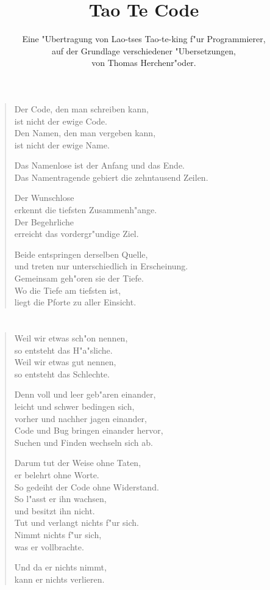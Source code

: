 \documentclass[a4paper,10pt,openany]{book}
\title{Tao Te Code}
\author{Eine "Ubertragung von Lao-tses Tao-te-king f"ur Programmierer,\\
auf der Grundlage verschiedener "Ubersetzungen,\\
von Thomas Herchenr"oder.}
\begin{document}
\maketitle


\chapter{}
\begin{verse}
Der Code, den man schreiben kann,\\
ist nicht der ewige Code.\\
Den Namen, den man vergeben kann,\\
ist nicht der ewige Name.

Das Namenlose ist der Anfang und das Ende.\\
Das Namentragende gebiert die zehntausend Zeilen.

Der Wunschlose\\
erkennt die tiefsten Zusammenh"ange.\\
Der Begehrliche\\
erreicht das vordergr"undige Ziel.

Beide entspringen derselben Quelle,\\
und treten nur unterschiedlich in Erscheinung.\\
Gemeinsam geh"oren sie der Tiefe.\\
Wo die Tiefe am tiefsten ist,\\
liegt die Pforte zu aller Einsicht.
\end{verse}

\chapter{}
\begin{verse}
Weil wir etwas sch"on nennen,\\
so entsteht das H"a"sliche.\\
Weil wir etwas gut nennen,\\
so entsteht das Schlechte.

Denn voll und leer geb"aren einander,\\
leicht und schwer bedingen sich,\\
vorher und nachher jagen einander,\\
Code und Bug bringen einander hervor,\\
Suchen und Finden wechseln sich ab.

Darum tut der Weise ohne Taten,\\
er belehrt ohne Worte.\\
So gedeiht der Code ohne Widerstand.\\
So l"asst er ihn wachsen,\\
und besitzt ihn nicht.\\
Tut und verlangt nichts f"ur sich.\\
Nimmt nichts f"ur sich,\\
was er vollbrachte.

Und da er nichts nimmt,\\
kann er nichts verlieren.
\end{verse}
\end{document}
